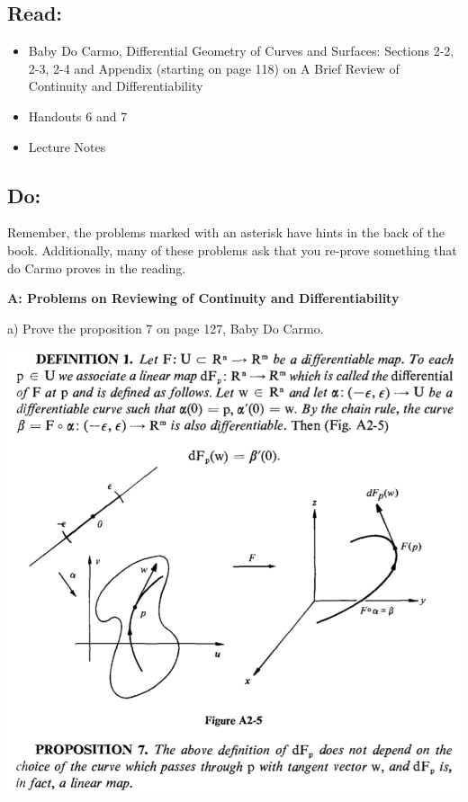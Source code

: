\documentclass[10pt,letterpaper]{hmcpset}
\begin{document}
\subsection*{ Read: } 

\begin{itemize}
\item{Baby Do Carmo, Differential Geometry
of Curves and Surfaces:  
Sections 2-2, 2-3, 2-4 and  Appendix (starting on page 118) on A Brief
Review of Continuity and Differentiability}
\item{Handouts 6 and 7}
\item{Lecture Notes}
\end{itemize}

\subsection*{ Do: }
Remember, the problems marked with an asterisk have hints in the back of the book. Additionally, many of these problems ask that you re-prove something that do Carmo proves in the reading.

\textbf{A: Problems on Reviewing of Continuity and Differentiability}\\
\begin{problem}
a) Prove the proposition 7 on page 127, Baby Do Carmo.

\includegraphics[scale=0.7]{Aa.png}
\end{problem}
\begin{solution}
\end{solution}
\end{document}
